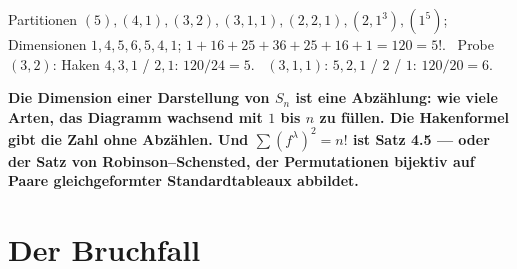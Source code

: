 \begin{merksatz}
Partitionen $(5), (4, 1), (3, 2), (3, 1, 1), (2, 2, 1), (2, 1^{3}), (1^{5})$; Dimensionen $1, 4, 5, 6, 5, 4, 1$; $1 + 16 + 25 + 36 + 25 + 16 + 1 = 120 = 5!$. \checkmark\ Probe $(3, 2)$: Haken $4, 3, 1$ / $2, 1$: $120/24 = 5$. \checkmark\ $(3, 1, 1)$: $5, 2, 1$ / $2$ / $1$: $120/20 = 6$. \checkmark

\begin{center}
\begin{minipage}{0.9\textwidth}
\textbf{Die Dimension einer Darstellung von $S_n$ ist eine Abzählung: wie viele Arten, das Diagramm wachsend mit $1$ bis $n$ zu füllen. Die Hakenformel gibt die Zahl ohne Abzählen. Und $\sum(f^{\lambda})^{2} = n!$ ist Satz 4.5 --- oder der Satz von Robinson--Schensted, der Permutationen bijektiv auf Paare gleichgeformter Standardtableaux abbildet.}
\end{minipage}
\end{center}
\end{merksatz}

\section{Der Bruchfall}

